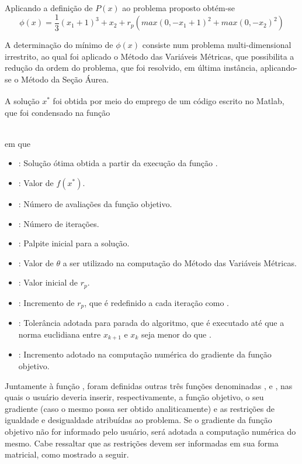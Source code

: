 \documentclass[12pt]{article}
\begin{document}
		Aplicando a definição de $ P(x) $ ao problema proposto obtém-se
		\begin{equation}
			\phi(x) = \frac{1}{3}(x_1 + 1)^3 + x_2 + r_p(max(0, -x_1 + 1)^2 + max(0, -x_2)^2)
		\end{equation}  
		
		A determinação do mínimo de $ \phi(x) $ consiste num problema multi-dimensional irrestrito, ao qual foi aplicado o Método das Variáveis Métricas, que possibilita a redução da ordem do problema, que foi resolvido, em última instância, aplicando-se o Método da Seção Áurea. 
		
		A solução $ x^* $ foi obtida por meio do emprego de um código escrito no Matlab\textsuperscript{\textregistered}, que foi condensado na função
		
		\noindent {} \\
		
		\noindent em que 
		\begin{itemize}
			\item {}: Solução ótima obtida a partir da execução da função .
			\item {}: Valor de $ f(x^*) $.
			\item {}: Número de avaliações da função objetivo.
			\item {}: Número de iterações.
			\item {}: Palpite inicial para a solução.
			\item {}: Valor de $ \theta $ a ser utilizado na computação do Método das Variáveis Métricas.
			\item {}: Valor inicial de $ r_p $.
			\item {}: Incremento de $ r_p $, que é redefinido a cada iteração como .
			\item {}: Tolerância adotada para parada do algoritmo, que é executado até que a norma euclidiana entre $ x_{k+1} $ e $ x_k $ seja menor do que .
			\item {}: Incremento adotado na computação numérica do gradiente da função objetivo.
 		\end{itemize}
 
 		Juntamente à função , foram definidas outras três funções denominadas ,  e , nas quais o usuário deveria inserir, respectivamente, a função objetivo, o seu gradiente (caso o mesmo possa ser obtido analiticamente) e as restrições de igualdade e desigualdade atribuídas ao problema. Se o gradiente da função objetivo não for informado pelo usuário, será adotada a computação numérica do mesmo. Cabe ressaltar que as restrições devem ser informadas em sua forma matricial, como mostrado a seguir.
 		
\end{document}
